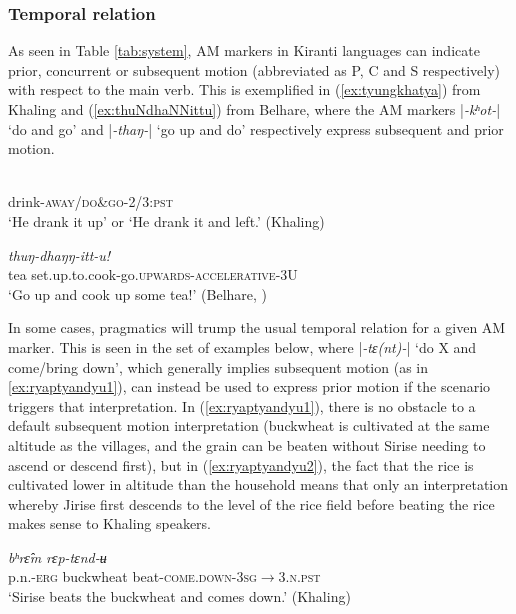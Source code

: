 \documentclass[oneside,a4paper,11pt]{article}
\newcommand{\ipa}[1]{{\phon\textit{#1}}}
\newcommand{\sens}[1]{‘#1’}
\newcommand{\rouge}[1]{{\color{red}#1}}
\newcommand{\dhatu}[2]{|\ipa{#1}| `#2'}
\begin{document}
 \subsubsection{Temporal relation} \label{sec:temporal.khaling}
As seen in Table \ref{tab:system}, AM markers in Kiranti languages can indicate prior, concurrent or subsequent motion (abbreviated as P, C and S respectively) with respect to the main verb.  This is exemplified in (\ref{ex:tyungkhatya}) from Khaling and (\ref{ex:thuNdhaNNittu}) from Belhare, where the AM markers \dhatu{-kʰot-}{do and go} and  \dhatu{-thaŋ-}{go up and do} respectively express subsequent and prior motion.

\begin{exe}
\ex \label{ex:tyungkhatya}
 \gll   \ipa{tʉ̂ŋ-\rouge{kʰʌ}-tɛ} \\
 drink-\textsc{away/\rouge{do\&go}}-\textsc{2/3:pst} \\
 \glt `He drank it up' or `He drank it and left.'  (Khaling)
 \end{exe}
 
 \begin{exe}
\ex \label{ex:thuNdhaNNittu}
 \gll   \ipa{cia}	\ipa{thuŋ-\rouge{dhaŋŋ}-itt-u!} \\
 tea set.up.to.cook-\rouge{go.\textsc{upwards}}-\textsc{accelerative}-3U \\
\glt \sens{Go up and cook up some tea!} (Belhare, \citealt[73]{bickel99spatial})
 \end{exe}

In some cases, pragmatics will trump the usual temporal relation for a given AM marker.  This is seen in the set of examples below, where  \dhatu{-tɛ(nt)-}{do X and come/bring down}, which  generally implies subsequent motion (as in \ref{ex:ryaptyandyu1}), can instead be used to express prior motion if the scenario triggers that interpretation.  In (\ref{ex:ryaptyandyu1}), there is no obstacle to a default subsequent motion interpretation (buckwheat is cultivated at the same altitude as the villages, and the grain can be beaten without Sirise needing to ascend or descend first), but in (\ref{ex:ryaptyandyu2}), the fact that the rice is cultivated lower in altitude than the household means that only an interpretation whereby Jirise first descends to the level of the rice field before beating the rice makes sense to Khaling speakers. 

 \begin{exe}
\ex \label{ex:ryaptyandyu1}
  \gll   \ipa{siriseʔ-ɛ} \ipa{bʰrɛ̂m}  \ipa{rɛp-\rouge{tɛnd}-ʉ} \\
   p.n.-\textsc{erg} buckwheat beat-\textsc{\rouge{come.down}}-\textsc{3sg$\rightarrow$3.n.pst} \\
\glt `Sirise beats the buckwheat and comes down.'  (Khaling)
 \end{exe}
 
\end{document}
